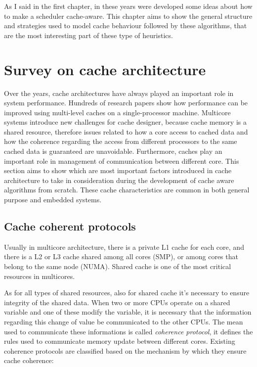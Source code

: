 As I said in the first chapter, in these years were developed some ideas about how to make a scheduler cache-aware.
This chapter aims to show the general structure and strategies used to model cache behaviour followed by these algorithms, that are the most interesting 
part of these type of heuristics.

\section{Survey on cache architecture}
\label{sec:s1}

Over the years, cache architectures have always played an important role in system performance. Hundreds of research papers show how performance
can be improved using multi-level caches on a single-processor machine. Multicore systems introduce new challenges for cache designer, because cache memory 
is a shared resource, therefore issues related to how a core access to cached data and how the coherence regarding the access from different processors 
to the same cached data is guaranteed are unavoidable. Furthermore, caches play an important role in management of communication between different core.
This section aims to show which are most important factors introduced in cache architecture to take in consideration during the development of cache aware
algorithms from scratch. These cache characteristics are common in both general purpose and embedded systems.

\subsection{Cache coherent protocols}

Usually in multicore architecture, there is a private L1 cache for each core, and there is a L2 or L3 cache shared among all cores (SMP), or among cores 
that belong to the same node (NUMA). Shared cache is one of the most critical resources in multicores.

As for all types of shared resources, also for shared cache it's necessary to ensure integrity of the shared data.
When two or more CPUs operate on a shared variable and one of these  modify the variable, it is necessary that the information regarding
this change of value be communicated to the other CPUs. The mean used to communicate these informations is called \textit{coherence protocol}, it defines 
the rules used to communicate memory update between different cores. Existing coherence protocols are classified based on the mechanism by which they ensure 
cache coherence: 

